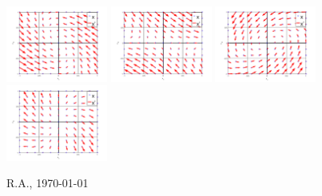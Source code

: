 \documentclass[12pt,a4paper]{article}
\begin{document}
    \includegraphics[width=0.25\textwidth]{A/17.png}
    \includegraphics[width=0.25\textwidth]{A/18.png}
    \includegraphics[width=0.25\textwidth]{A/19.png}
    \includegraphics[width=0.25\textwidth]{A/20.png}
    
    \vfill\hfill 
    R.A., \today
\end{document}
